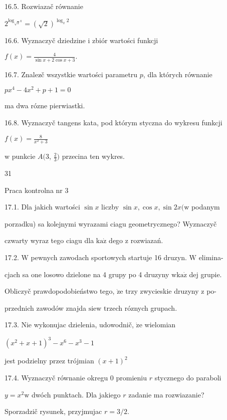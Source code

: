 \documentclass[a4paper,12pt]{article}
\begin{document}
16.5. Rozwiazač równanie

$2^{\log_{\sqrt{2}^{X}}}=(\sqrt{2})^{\log_{x}2}$

16.6. Wyznaczyč dziedzine $\mathrm{i}$ zbiór wartości funkcji

$f(x)=\displaystyle \frac{4}{\sin x+2\cos x+3}.$

16.7. Znalez$\acute{}$č wszystkie wartości parametru $p$, dla których równanie

$px^{4}-4x^{2}+p+1=0$

ma dwa rózne pierwiastki.

16.8. Wyznaczyč tangens kata, pod którym styczna do wykresu funkcji

$f(x)=\displaystyle \frac{8}{x^{2}+3}$

$\mathrm{w}$ punkcie $A($3, $\displaystyle \frac{2}{3})$ przecina ten wykres.





31

Praca kontrolna nr 3

17.1. Dla jakich wartości $\sin x$ liczby $\sin x, \cos x, \sin 2x (\mathrm{w}$ podanym

porzadku) sa kolejnymi wyrazami ciagu geometrycznego? Wyznaczyč

czwarty wyraz tego ciagu dla $\mathrm{k}\mathrm{a}\dot{\mathrm{z}}$ dego $\mathrm{z}$ rozwiazań.

17.2. $\mathrm{W}$ pewnych zawodach sportowych startuje 16 druzyn. $\mathrm{W}$ elimina-

cjach sa one losowo dzielone na 4 grupy po 4 druzyny $\mathrm{w}\mathrm{k}\mathrm{a}\dot{\mathrm{z}}$ dej grupie.

Obliczyč prawdopodobieństwo tego, $\dot{\mathrm{z}}\mathrm{e}$ trzy zwycieskie druzyny $\mathrm{z}$ po-

przednich zawodów znajda $\mathrm{s}\mathrm{i}\mathrm{e}\mathrm{w}$ trzech róznych grupach.

17.3. Nie wykonujac dzielenia, udowodnič, $\dot{\mathrm{z}}\mathrm{e}$ wielomian

$(x^{2}+x+1)^{3}-x^{6}-x^{3}-1$

jest podzielny przez trójmian $(x+1)^{2}$

17.4. Wyznaczyč równanie okregu $0$ promieniu $r$ stycznego do paraboli

$y=x^{2}\mathrm{w}$ dwóch punktach. Dla jakiego $r$ zadanie ma rozwiazanie?

Sporzadzič rysunek, przyjmujac $r=3/2.$
\end{document}

